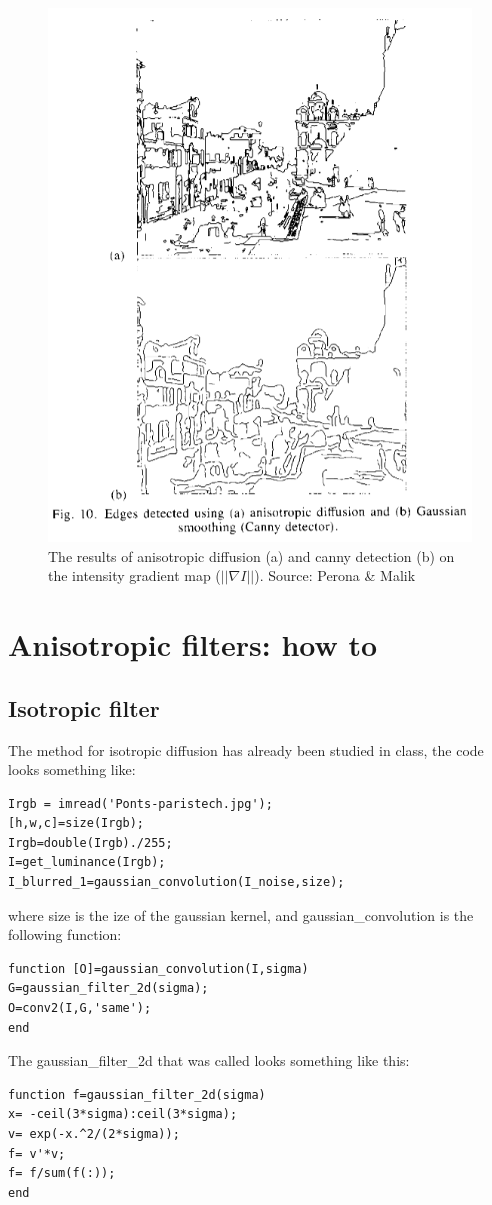 \documentclass[12pt,a4paper]{book}
\begin{document}
\begin{figure}
		\caption{The results of anisotropic diffusion (a) and canny detection (b) on the intensity gradient map ($||\nabla I||$). Source: Perona \& Malik}
		\includegraphics{EdgeEnhancement_Example.png}
\end{figure}

\section{Anisotropic filters: how to}

\subsection{Isotropic filter}

The method for isotropic diffusion has already been studied in class, the code looks something like:
\begin{lstlisting}
Irgb = imread('Ponts-paristech.jpg');
[h,w,c]=size(Irgb);
Irgb=double(Irgb)./255;
I=get_luminance(Irgb);
I_blurred_1=gaussian_convolution(I_noise,size);
\end{lstlisting}
where size is the ize of the gaussian kernel, and gaussian\_convolution is the following function:
\begin{lstlisting}
function [O]=gaussian_convolution(I,sigma)
G=gaussian_filter_2d(sigma); 
O=conv2(I,G,'same');
end
\end{lstlisting}
The gaussian\_filter\_2d that was called looks something like this:
\begin{lstlisting}
function f=gaussian_filter_2d(sigma)
x= -ceil(3*sigma):ceil(3*sigma);
v= exp(-x.^2/(2*sigma));
f= v'*v;
f= f/sum(f(:));
end
\end{lstlisting}
\end{document}
